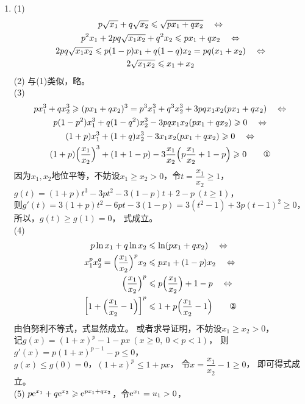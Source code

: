 \begin{enumerate}[label={\textbf{\thechapter.\arabic*}},leftmargin=
    \inteval{\myenumleftmargin}pt]
\item  (1)
\begin{gather*}
    p\sqrt{x_1}+q\sqrt{x_2}\leqslant \sqrt{px_1+qx_2}\quad \Leftrightarrow \\
    p^2x_1+2pq\sqrt{x_1x_2}+q^2x_2\leqslant px_1+qx_2\quad \Leftrightarrow \\
    2pq\sqrt{x_1x_2}\leqslant p(1-p)x_1+q(1-q)x_2=pq(x_1+x_2)\quad \Leftrightarrow \\
    2\sqrt{x_1x_2}\leqslant x_1+x_2    
\end{gather*}
(2) 与(1)类似，略。\\
(3) 
\begin{gather*}
    px_1^3+qx_2^3\geq (px_1+qx_2)^3=p^3x_1^3+q^3x_2^3+3pqx_1x_2(px_1+qx_2)
    \q \Leftrightarrow \\ 
    p(1-p^2)x_1^3+q(1-q^2)x_2^3-3pqx_1x_2(px_1+qx_2)\geq 0
    \q \Leftrightarrow  \\
    (1+p)x_1^3+(1+q)x_2^3-3x_1x_2(px_1+qx_2)\geq 0
    \q \Leftrightarrow  \\
    (1+p)\Big(\dfrac{x_1}{x_2}\Big)^3+(1+1-p)-3\dfrac{x_1}{x_2}
    \Big(p\dfrac{x_1}{x_2}+1-p\Big)\geq 0 \tag*{\ding{172}}
\end{gather*}
因为$ x_1,x_2 $地位平等，不妨设$ x_1\geq x_2>0 $，令$ t=\dfrac{x_1}{x_2}\geq 1 $，\\
$ g(t)=(1+p)t^3-3pt^2-3(1-p)t+2-p\ (t\geq 1) $，\\ 则$ g'(t)=3(1+p)t^2-6pt-3(1-p)=
3(t^2-1)+3p(t-1)^2\geq 0 $，所以，$ g(t)\geq g(1)=0 $，
式成立。\\
(4) 
\begin{align*}
    p\ln x_1+q\ln x_2 &\leq \ln(px_1+qx_2) \q \Leftrightarrow \\
    x_1^{p}x_2^q=\Big(\dfrac{x_1}{x_2}\Big)^p x_2 &\leq px_1+(1-p)x_2
    \q \Leftrightarrow \\
    \Big(\dfrac{x_1}{x_2}\Big)^p &\leq p\Big(\dfrac{x_1}{x_2}\Big)+1-p
    \q \Leftrightarrow \\
    \left[1+\Big(\dfrac{x_1}{x_2}-1\Big)\right]^p &\leq 
    1+p\Big(\dfrac{x_1}{x_2}-1\Big) \tag*{\ding{173}}
\end{align*}
由伯努利不等式，式显然成立。
或者求导证明，不妨设$ x_1\geq x_2>0 $，\\
记$ g(x)=(1+x)^p-1-px\ (x\geq 0,\ 0<p<1) $，
则$ g'(x)=p(1+x)^{p-1}-p\leq 0 $，\\ 
$ g(x)\leq g(0)=0 $，$ (1+x)^p\leq 1+px $，
令$ x=\dfrac{x_1}{x_2}-1\geq 0 $，
即可得式成立。\\
(5) $ p\mathrm{e}^{x_1}+q\mathrm{e}^{x_2}\geqslant \mathrm{e}^{px_1+qx_2} $，令$ \mathrm{e}^{x_1}=u_1>0 $，

\end{enumerate}
